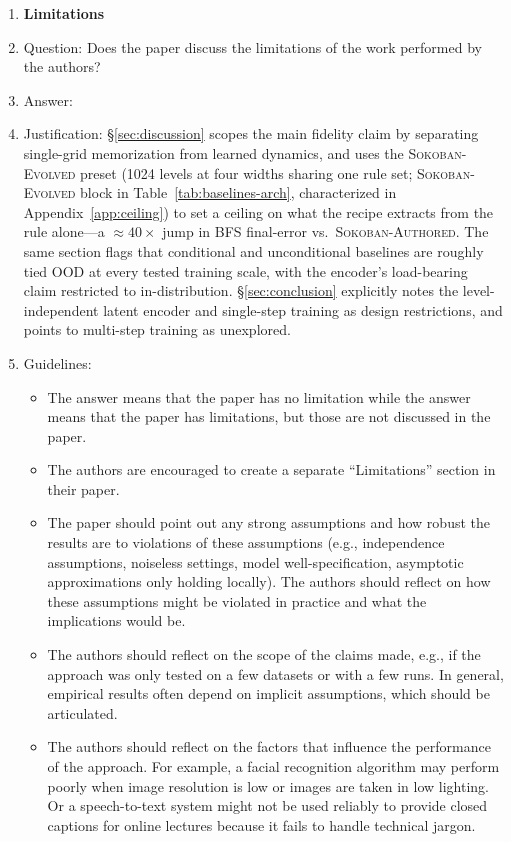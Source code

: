 \begin{enumerate}
\item {\bf Limitations}
    \item[] Question: Does the paper discuss the limitations of the work performed by the authors?
    \item[] Answer: \answerYes{}
    \item[] Justification: \S\ref{sec:discussion} scopes the main fidelity claim by separating single-grid memorization from learned dynamics, and uses the \textsc{Sokoban-Evolved} preset (1024 levels at four widths sharing one rule set; \textsc{Sokoban-Evolved} block in Table~\ref{tab:baselines-arch}, characterized in Appendix~\ref{app:ceiling}) to set a ceiling on what the recipe extracts from the rule alone---a $\approx 40\times$ jump in BFS final-error vs.\ \textsc{Sokoban-Authored}. The same section flags that conditional and unconditional baselines are roughly tied OOD at every tested training scale, with the encoder's load-bearing claim restricted to in-distribution. \S\ref{sec:conclusion} explicitly notes the level-independent latent encoder and single-step training as design restrictions, and points to multi-step training as unexplored.
    \item[] Guidelines:
    \begin{itemize}
        \item The answer \answerNA{} means that the paper has no limitation while the answer \answerNo{} means that the paper has limitations, but those are not discussed in the paper.
        \item The authors are encouraged to create a separate ``Limitations'' section in their paper.
        \item The paper should point out any strong assumptions and how robust the results are to violations of these assumptions (e.g., independence assumptions, noiseless settings, model well-specification, asymptotic approximations only holding locally). The authors should reflect on how these assumptions might be violated in practice and what the implications would be.
        \item The authors should reflect on the scope of the claims made, e.g., if the approach was only tested on a few datasets or with a few runs. In general, empirical results often depend on implicit assumptions, which should be articulated.
        \item The authors should reflect on the factors that influence the performance of the approach. For example, a facial recognition algorithm may perform poorly when image resolution is low or images are taken in low lighting. Or a speech-to-text system might not be used reliably to provide closed captions for online lectures because it fails to handle technical jargon.

\end{itemize}
\end{enumerate}
